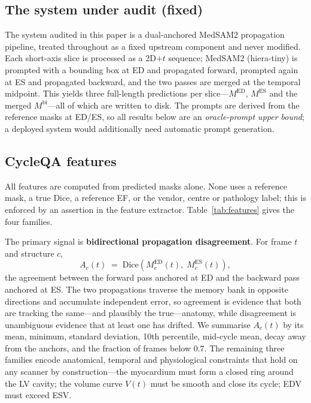 \documentclass[runningheads]{llncs}
\newcommand{\CQ}{CycleQA}
\begin{document}
\subsection{The system under audit (fixed)}\label{sec:system}
The system audited in this paper is a dual-anchored MedSAM2 propagation pipeline, treated
throughout as a fixed upstream component and never modified. Each short-axis slice is processed as a 2D$+t$
sequence; MedSAM2 (hiera-tiny) is prompted with a bounding box at ED and propagated forward,
prompted again at ES and propagated backward, and the two passes are merged at the temporal
midpoint. This yields three full-length predictions per slice---$M^{\mathrm{ED}}$,
$M^{\mathrm{ES}}$ and the merged $M^{\mathrm{bi}}$---all of which are written to disk. The
prompts are derived from the reference masks at ED/ES, so all results below are an
\emph{oracle-prompt upper bound}; a deployed system would additionally need automatic
prompt generation.

\subsection{\CQ{} features}
All features are computed from predicted masks alone. None uses a reference mask, a true
Dice, a reference EF, or the vendor, centre or pathology label; this is enforced by an
assertion in the feature extractor. Table~\ref{tab:features} gives the four families.

The primary signal is \textbf{bidirectional propagation disagreement}. For frame $t$ and
structure $c$,
\begin{equation}
A_c(t) \;=\; \mathrm{Dice}\!\left(M^{\mathrm{ED}}_c(t),\; M^{\mathrm{ES}}_c(t)\right),
\end{equation}
the agreement between the forward pass anchored at ED and the backward pass anchored at ES.
The two propagations traverse the memory bank in opposite directions and accumulate
independent error, so agreement is evidence that both are tracking the same---and
plausibly the true---anatomy, while disagreement is unambiguous evidence that at least one
has drifted. We summarise $A_c(t)$ by its mean, minimum, standard deviation, 10th
percentile, mid-cycle mean, decay away from the anchors, and the fraction of frames below
0.7. The remaining three families encode anatomical, temporal and physiological constraints
that hold on any scanner by construction---the myocardium must form a closed ring around the
LV cavity; the volume curve $V(t)$ must be smooth and close its cycle; EDV must exceed ESV.
\end{document}
